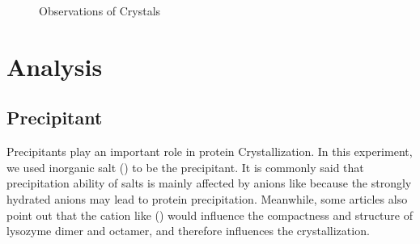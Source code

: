 \documentclass[UTF-8]{article}
\begin{document}
\begin{figure}[ht]
    \vfill %

    \hfill
    \hfill
    
    \caption{Observations of Crystals}
    \label{Observations of Crystals}
\end{figure}
\section{Analysis}
\subsection{Precipitant}
Precipitants play an important role in protein Crystallization\cite{JIANG2023123187}.
In this experiment, we used inorganic salt () to be the precipitant.
It is commonly said that precipitation ability of salts is mainly affected by anions like  because the strongly hydrated anions may lead to protein precipitation.
Meanwhile, some articles\cite{JIANG2023123187} also point out that the cation like () would influence the compactness and structure of lysozyme dimer and octamer, and therefore influences the crystallization.
\end{document}
